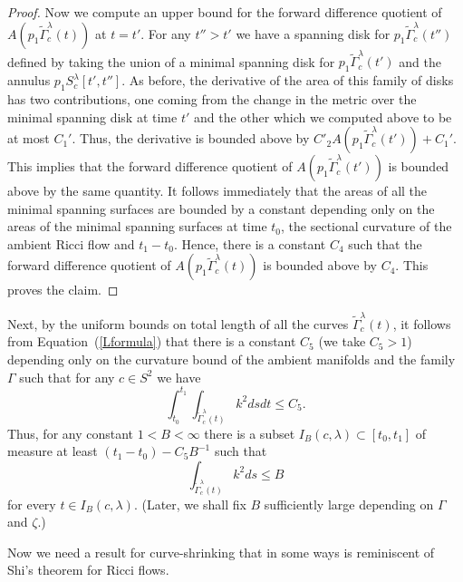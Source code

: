 \begin{proof}
Now we compute an upper bound for the forward difference quotient of
$A(p_1\widetilde \Gamma^\lambda_c(t))$ at $t=t'$. For any $t''>t'$
we have a spanning disk for $p_1\widetilde\Gamma^\lambda_c(t'')$
defined by taking the union of a minimal spanning disk for
$p_1\widetilde \Gamma^\lambda_c(t')$ and the annulus
$p_1S^\lambda_c[t',t'']$. As before, the derivative of the area of
this family of disks has two contributions, one coming from the
change in the metric over the minimal spanning disk at time $t'$ and
the other which we computed above to be at most $C_1'$. Thus, the
derivative is bounded above by
$C'_2A(p_1\widetilde\Gamma^\lambda_c(t'))+C_1'$. This implies that
the forward difference quotient of $A(p_1\widetilde
\Gamma^\lambda_c(t'))$ is bounded above by the same quantity. It
follows immediately that the areas of all the minimal spanning
surfaces are bounded by a constant depending only on the areas of
the minimal spanning surfaces at time $t_0$, the sectional curvature
of the ambient Ricci flow and $t_1-t_0$. Hence, there is a constant
$C_4$ such that the forward difference quotient of
$A(p_1\widetilde\Gamma^\lambda_c(t))$ is bounded above by $C_4$.
This proves the claim.
\end{proof}



Next, by the uniform bounds on total length of all the curves
$\widetilde\Gamma_c^\lambda(t)$, it follows from
Equation~(\ref{Lformula}) that there is a constant $C_5$ (we take
$C_5>1$) depending only on the curvature bound of the ambient
manifolds and the family $\Gamma$ such that for any $c\in S^2$ we
have
\begin{equation}\label{C5eqn}\int_{t_0}^{t_1}\int_{\widetilde\Gamma_c^\lambda(t)}
k^2dsdt\le C_5. \end{equation} Thus, for any constant $1<B<\infty$
there is a subset $I_B(c,\lambda)\subset [t_0,t_1]$ of measure at
least $(t_1-t_0)-C_5B^{-1}$ such that
$$\int_{\widetilde\Gamma_c^\lambda(t)}k^2ds\le B$$
for every $t\in I_B(c,\lambda)$. (Later, we shall fix $B$
sufficiently large depending on $\Gamma$ and $\zeta$.)

Now we need a result for curve-shrinking that in some ways is
reminiscent of Shi's theorem for Ricci flows.

